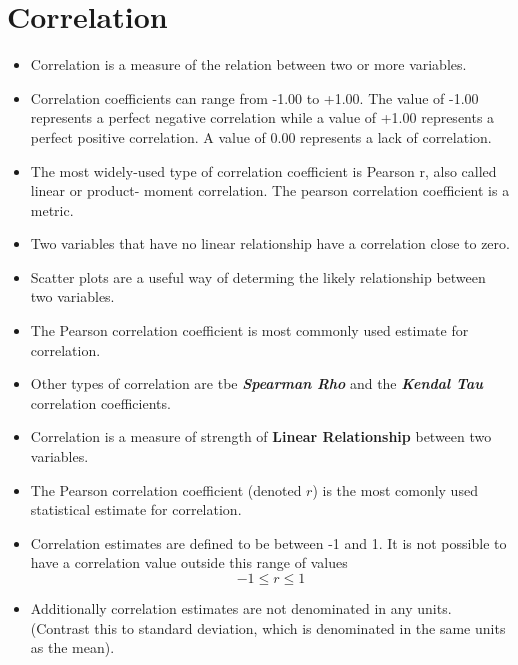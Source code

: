\documentclass[]{report}
\begin{document}
\section{Correlation}
\begin{itemize}
	\item Correlation is a measure of the relation between two or more variables. 
	\item Correlation coefficients can range from -1.00 to +1.00. The value of -1.00 represents a perfect negative correlation while a value of +1.00 represents a perfect positive correlation. A value of 0.00 represents a lack of correlation.


	\item 
	The most widely-used type of correlation coefficient is Pearson r, also called linear or product- moment correlation.
	The pearson correlation coefficient is a metric.

	\item  Two variables that have no linear relationship have a correlation close to zero. 
	
	\item Scatter plots are a useful way of determing the likely relationship between two variables. 
	
	\item The Pearson correlation coefficient is most commonly used estimate for correlation. 
	
	\item Other types of correlation are tbe \textit{\textbf{Spearman Rho}} and the \textit{\textbf{Kendal Tau}} correlation coefficients. 
	
\end{itemize}



\begin{itemize}
	\item Correlation is a measure of strength of \textbf{Linear Relationship} between two variables.
	\item The Pearson correlation coefficient (denoted $r$) is the most comonly used statistical estimate for correlation. 
	\item Correlation estimates are defined to be between -1 and 1. It is not possible to have a correlation value outside this range of values
	\[ -1 \leq r \leq 1\]
	\item 
	Additionally correlation estimates are not denominated in any units. (Contrast this to standard deviation, which is denominated in the same units as the mean).
\end{itemize}
\end{document}
